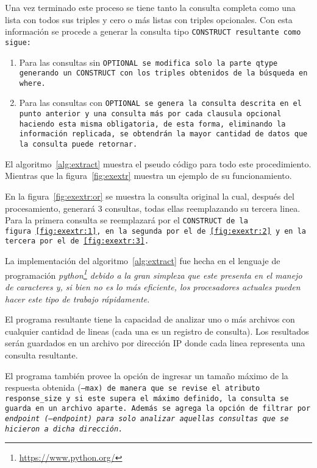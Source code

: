 Una vez terminado este proceso se tiene tanto la consulta completa como una
lista con todos sus triples  y cero o más listas con triples
opcionales.
Con esta información se procede a generar la consulta tipo \tt{CONSTRUCT}
resultante como sigue:
\begin{enumerate}
  \item
    Para las consultas sin \tt{OPTIONAL} se modifica solo la parte \tt{qtype}
    generando un \tt{CONSTRUCT} con los triples obtenidos de la búsqueda en
    \tt{where}.
  \item
    Para las consultas con \tt{OPTIONAL} se genera la consulta descrita en el
    punto anterior y una consulta más por cada clausula opcional haciendo esta
    misma obligatoria, de esta forma, eliminando la información replicada, se 
    obtendrán la mayor cantidad de datos que la consulta puede retornar.
\end{enumerate}


El algoritmo~\ref{alg:extract} muestra el pseudo código para todo este
procedimiento. Mientras que la figura~\ref{fig:exextr} muestra un ejemplo de
su funcionamiento.



En la figura~\ref{fig:exextr:or} se muestra la consulta original la cual,
después del procesamiento, generará 3 consultas, todas ellas reemplazando su
tercera linea. Para la primera consulta se reemplazará por el \tt{CONSTRUCT} de
la figura~\ref{fig:exextr:1}, en la segunda por el de~\ref{fig:exextr:2} y en la
tercera por el de~\ref{fig:exextr:3}.



La implementación del algoritmo~\ref{alg:extract} fue hecha en el lenguaje de
programación \it{python}\footnote{\url{https://www.python.org/}}
debido a la gran simpleza que este presenta en el manejo de caracteres y, si
bien no es lo más eficiente, los procesadores actuales pueden hacer este tipo de
trabajo rápidamente.

El programa resultante tiene la capacidad de analizar uno o más archivos con
cualquier cantidad de lineas (cada una es un registro de consulta).
Los resultados serán guardados en un archivo por dirección IP donde cada linea
representa una consulta resultante.

El programa también provee la opción de ingresar un tamaño máximo de la 
respuesta obtenida (\tt{--max}) de manera que se revise el atributo 
\tt{response\_size} y si este supera el máximo definido, la consulta se guarda
en un archivo aparte.
Además se agrega la opción de filtrar por \it{endpoint} (\tt{--endpoint}) para 
solo analizar aquellas consultas que se hicieron a dicha dirección.

